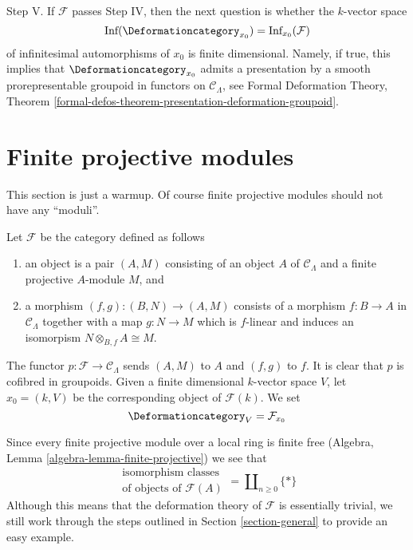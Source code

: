 \medskip\noindent
Step V. If $\mathcal{F}$ passes Step IV, then the next question is whether
the $k$-vector space
$$
\text{Inf}(\Deformationcategory_{x_0}) = \text{Inf}_{x_0}(\mathcal{F})
$$
of infinitesimal automorphisms of $x_0$ is finite dimensional.
Namely, if true, this implies that
$\Deformationcategory_{x_0}$ admits a presentation by a
smooth prorepresentable groupoid in functors on $\mathcal{C}_\Lambda$, see
Formal Deformation Theory, Theorem
\ref{formal-defos-theorem-presentation-deformation-groupoid}.




\section{Finite projective modules}
\label{section-finite-projective-modules}

\noindent
This section is just a warmup. Of course finite projective modules
should not have any ``moduli''.

\begin{example}
\label{example-finite-projective-modules}
Let $\mathcal{F}$ be the category defined as follows
\begin{enumerate}
\item an object is a pair $(A, M)$ consisting of an
object $A$ of $\mathcal{C}_\Lambda$ and a
finite projective $A$-module $M$, and
\item a morphism $(f, g) : (B, N) \to (A, M)$ consists of
a morphism $f : B \to A$ in $\mathcal{C}_\Lambda$ together
with a map $g : N \to M$ which is $f$-linear and induces
an isomorpism $N \otimes_{B, f} A \cong M$.
\end{enumerate}
The functor $p : \mathcal{F} \to \mathcal{C}_\Lambda$ sends $(A, M)$ to $A$
and $(f, g)$ to $f$. It is clear that $p$ is cofibred in groupoids.
Given a finite dimensional $k$-vector space $V$,
let $x_0 = (k, V)$ be the corresponding object of $\mathcal{F}(k)$.
We set
$$
\Deformationcategory_V = \mathcal{F}_{x_0}
$$
\end{example}

\noindent
Since every finite projective module over a local ring is finite free
(Algebra, Lemma \ref{algebra-lemma-finite-projective})
we see that
$$
\begin{matrix}
\text{isomorphism classes} \\
\text{of objects of }\mathcal{F}(A)
\end{matrix}
= \coprod\nolimits_{n \geq 0} \{*\}
$$
Although this means that the deformation theory of $\mathcal{F}$
is essentially trivial, we still work through the steps outlined
in Section \ref{section-general} to provide an easy example.

